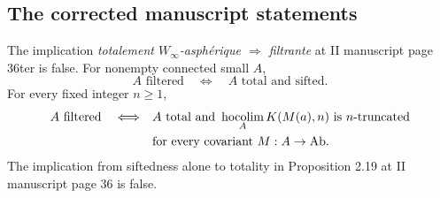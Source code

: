 \subsection{The corrected manuscript statements}
\begin{proposition}\label{D:manuscript}
The implication \emph{totalement $W_\infty$-asph\'erique
$\Longrightarrow$ filtrante} at II manuscript page 36ter is false.
For nonempty connected small $A$,
\[
 A\text{ filtered}\quad\Longleftrightarrow\quad
 A\text{ total and sifted}.
\]
For every fixed integer $n\geq1$,
\[
\begin{split}
 A\text{ filtered}\quad\Longleftrightarrow\quad&
 A\text{ total and }
 \operatorname*{hocolim}_A K(M(a),n)\text{ is }n\text{-truncated}\\
 &\text{for every covariant }M:A\to\mathrm{Ab}.
\end{split}
\]
The implication from siftedness alone to totality in Proposition
2.19 at II manuscript page 36 is false.
\end{proposition}
